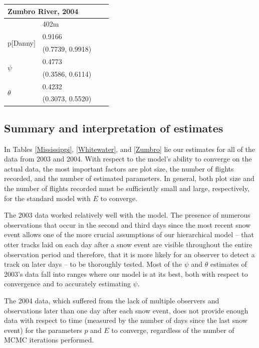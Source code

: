 \documentclass[12pt]{article}
\begin{document}
\begin{table}
    \begin{center}
    \begin{tabular}{|l|l|l|l|}
        \hline
        \multicolumn{2}{|l|}{\textbf{Zumbro River, 2004}} \\
        \hline
            & 402m \\
        \hline
        \multirow{2}{*}{p[Danny]}
            & 0.9166 \\
            & (0.7739, 0.9918) \\
        \hline
        \multirow{2}{*}{\(\psi\)}
            & 0.4773 \\
            & (0.3586, 0.6114) \\
        \hline
        \multirow{2}{*}{\(\theta\)}
            & 0.4232 \\
            & (0.3073, 0.5520) \\
        \hline
    \end{tabular}
    \end{center}
    \end{table}

    \subsection{Summary and interpretation of estimates}
    In Tables \ref{Mississippi}, \ref{Whitewater}, and \ref{Zumbro} lie our
    estimates for all of the data from
    2003 and 2004.
    With respect to the model's ability to converge on the actual data, the most
    important factors are plot size, the number of flights recorded, and the
    number of estimated parameters. In general, both plot size and the number of
    flights recorded must be sufficiently small and large, respectively, for the
    standard model with \(E\) to converge.

    The 2003 data worked relatively well with the model. The presence of
    numerous
    observations that occur in the second and third days since the most recent
    snow event allows one of the more crucial assumptions of our hierarchical
    model -- that otter tracks laid on each day after a snow event are visible
    throughout the entire observation period and therefore, that it is more
    likely for an observer to detect a track on later days -- to be thoroughly
    tested. Most of the \(\psi\) and \(\theta\) estimates of 2003's data fall
    into ranges where our model is at its best, both with respect to convergence
    and to accurately estimating \(\psi\).

    The 2004 data, which suffered from the lack of multiple observers and
    observations later than one day after each snow event, does not provide
    enough data with respect to time (measured by the number of days since the
    last snow event) for the parameters \(p\) and \(E\) to converge, regardless
    of the number of MCMC iterations performed.
\end{document}
